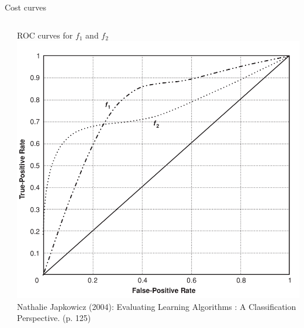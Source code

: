 \begin{vbframe}{Cost curves}
\begin{columns}
\begin{column}{0.6\textwidth}
\end{column}
\begin{column}{0.39\textwidth}
    \centering
    \tiny ROC curves for $f_1$ and $f_2$
    \includegraphics[width=\textwidth]{figure_man/cost-curves-1.png}
    {\tiny Nathalie Japkowicz (2004): Evaluating Learning Algorithms : A
    Classification Perspective. (p. 125)}
\end{column}
\end{columns}


\end{vbframe}






